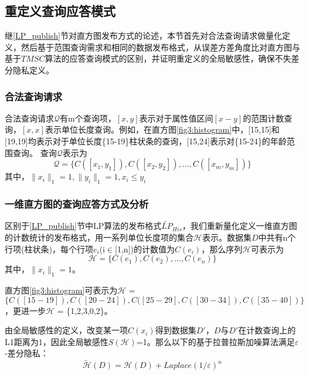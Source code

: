\subsection{重定义查询应答模式}

继\ref{LP_publish}节对直方图发布方式的论述，本节首先对合法查询请求做量化定义，然后基于范围查询需求和相同的数据发布格式，从误差方差角度比对直方图与基于$TMSC$算法的应答查询模式的区别，并证明重定义的全局敏感性，确保不失差分隐私定义。

\subsubsection{合法查询请求}

合法查询请求$\mathcal{Q}$有m个查询项，$[x,y]$表示对于属性值区间$[x-y]$的范围计数查询，$[x,x]$表示单位长度查询。例如，在直方图\ref{fig3:histogram}中，[15,15]和[19,19]均表示对于单位长度\{15-19\}柱状条的查询，[15,24]表示对\{15-24\}的年龄范围查询。
查询$\mathcal{Q}$表示为
\[
\mathcal{Q} = \{C([x_{1},y_{1}]),C([x_{2},y_{2}]),...,C([x_{m},y_{m}])\}
\]
其中，$\|x_{i}\|_{1} = 1, \|y_{i}\|_{1} = 1, x_{i} \leqslant y_{i}$

\subsubsection{一维直方图的查询应答方式及分析}

区别于\ref{LP_publish}节中LP算法的发布格式$\widetilde{LP}_{His}$，我们重新量化定义一维直方图的计数统计的发布格式，用一系列单位长度项的集合$\mathcal{H}$表示。数据集$D$中共有n个行项(柱状条)，每个行项$e_{i}$(i$\in$[1,n])的计数值为$C(e_{i})$，那么序列$\mathcal{H}$可表示为
\begin{equation*}
	\mathcal{H} = \{C(e_{1}),C(e_{2}),...,C(e_{n})\}
\end{equation*}
其中，$\|x_{i}\|_{1} = 1$。

\begin{exmp}
	\label{chap4_exmp}
	直方图\ref{fig3:histogram}可表示为$\mathcal{H}$ = $\{C([15-19]),C([20-24]),C([25-29],C([30-34]),C([35-40])\}$，更进一步$\mathcal{H}$ = \{1,2,3,0,2\}。
\end{exmp}

由全局敏感性的定义，改变某一项$C(x_{i})$得到数据集$D'$，$D$与$D'$在计数查询上的L1距离为1，因此全局敏感性$S(\mathcal{H})$=1。那么以下的基于拉普拉斯加噪算法满足$\varepsilon$-差分隐私：
\begin{equation}
	\label{chap4_lap}
	\tilde{\mathcal{H}}(D) = \mathcal{H}(D) + \textit{Laplace}(1/\varepsilon)^n
\end{equation}


